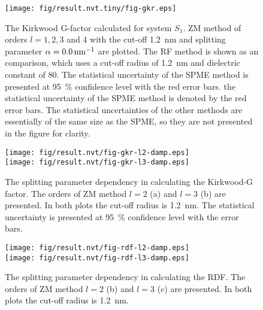 \documentclass[aip,jcp,a4paper,reprint,unsortedaddress,onecolumn,fleqn]{revtex4}
\begin{document}
\begin{figure}[tbp]
\centering
\texttt{[image: fig/result.nvt.tiny/fig-gkr.eps]}
\caption{
  The Kirkwood G-factor calculated for system $S_{1}$.
  ZM method of orders $l=1,2,3$ and 4 with the cut-off 1.2~nm and
splitting parameter $\protect\alpha =0.0\,\text{nm}^{-1}$ are plotted. The
RF method is shown as an comparison, which uses a cut-off radius of 1.2~nm
and dielectric constant of 80. The statistical uncertainty of the SPME
method is presented at 95~\% confidence level with the red error bars. the
statistical uncertainty of the SPME method is denoted by the red error bars.
The statistical uncertainties of the other methods are essentially of the
same size as the SPME, so they are not presented in the figure for clarity.
}
\label{fig:gkr-conv-alpha}
\end{figure}

\begin{figure}[tbp]
\centering
\texttt{[image: fig/result.nvt/fig-gkr-l2-damp.eps]}\\
\texttt{[image: fig/result.nvt/fig-gkr-l3-damp.eps]}
\caption{  The 
  splitting parameter dependency in calculating the Kirkwood-G factor.
  The orders of ZM method $l=2$ (a)  and $l=3$ (b) are presented.
  In both plots the cut-off radius is 1.2~nm. The
  statistical uncertainty is presented at 95~\% confidence level with the
  error bars. }
\label{fig:gkr-conv-alpha}
\end{figure}


\begin{figure}[tbp]
\centering
\texttt{[image: fig/result.nvt/fig-rdf-l2-damp.eps]}\\
\texttt{[image: fig/result.nvt/fig-rdf-l3-damp.eps]}
\caption{  The 
  splitting parameter dependency in calculating the RDF.
  The orders of ZM method  $l=2$ (b)  and $l=3$ (c) are presented.
  In both plots the cut-off radius is 1.2~nm. }
\label{fig:gkr-conv-alpha}
\end{figure}




\newpage 

{}

\end{document}
